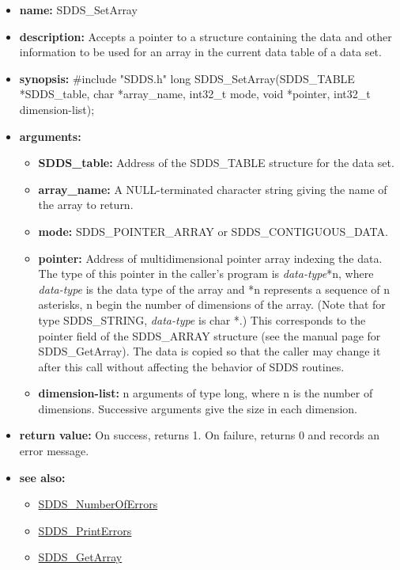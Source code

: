 \documentclass[11pt]{article}
\newcommand{\progref}[1]{\hyperref{SDDS_#1}{{\tt SDDS\_#1} (}{)}{SDDS_#1}}
\begin{document}
\begin{itemize}
\item {\bf name:}\newline
SDDS\_SetArray
\item {\bf description:}\newline
Accepts a pointer to a structure containing the data and other information to be used for an array in the current data table of a data set.
\item {\bf synopsis:} \#include "SDDS.h"\newline
long SDDS\_SetArray(SDDS\_TABLE *SDDS\_table, char *array\_name, int32\_t mode, void *pointer, int32\_t dimension-list);
\item {\bf arguments:}
\begin{itemize}
\item {\bf SDDS\_table:} Address of the SDDS\_TABLE structure for the data set.
\item {\bf array\_name:} A NULL-terminated character string giving the name of the array to return.
\item {\bf mode:} SDDS\_POINTER\_ARRAY or SDDS\_CONTIGUOUS\_DATA.
\item {\bf pointer:} Address of multidimensional pointer array indexing the data. The type of this pointer in the caller's program is {\em data-type}*n, where {\em data-type} is the data type of the array and *n represents a sequence of n asterisks, n begin the number of dimensions of the array. (Note that for type SDDS\_STRING, {\em data-type} is char *.) This corresponds to the  pointer field of the SDDS\_ARRAY structure (see the manual page for SDDS\_GetArray). The data is copied so that the caller may change it after this call without affecting the behavior of SDDS routines.
\item {\bf dimension-list:} n arguments of type long, where n is the number of dimensions. Successive arguments give the size in each dimension.
\end{itemize}
\item {\bf return value:}\newline
On success, returns 1. On failure, returns 0 and records an error message.
\item {\bf see also:}
\begin{itemize}
\item \progref{NumberOfErrors}
\item \progref{PrintErrors}
\item \progref{GetArray}
\end{itemize}
\end{itemize}
\end{document}
